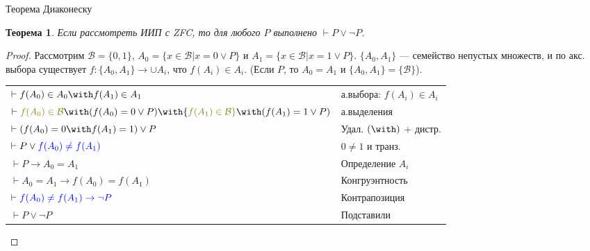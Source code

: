 \documentclass[aspectratio=169]{beamer}
\newtheorem{thm}{Теорема}[section]
\begin{document}
\begin{frame}{Теорема Диаконеску}
\begin{thm}Если рассмотреть ИИП с ZFC, то для любого $P$ выполнено $\vdash P \vee \neg P$.\end{thm}
\begin{proof}Рассмотрим $\mathcal{B} = \{0,1\}$, $A_0 = \{ x \in \mathcal{B} | x = 0 \vee P \}$ и 
$A_1 = \{ x \in \mathcal{B} | x = 1 \vee P\}$.
$\{A_0,A_1\}$ --- семейство непустых множеств, и по акс. выбора существует
$f: \{A_0,A_1\} \rightarrow \cup A_i$, что $f(A_i) \in A_i$. (Если $P$, то $A_0 = A_1$ и $\{A_0,A_1\} = \{\mathcal{B}\}$).

\vspace{0.3cm}
\begin{tabular}{ll}
$\vdash f(A_0) \in A_0 \with f(A_1) \in A_1$ & а.выбора: $f(A_i) \in A_i$\\
$\vdash {\color{olive}f(A_0) \in \mathcal{B}} \with (f(A_0) = 0 \vee P) \with {\color{olive}f(A_1) \in \mathcal{B}} \with (f(A_1) = 1 \vee P)$ & а.выделения\\
$\vdash (f(A_0) = 0 \with f(A_1) = 1) \vee P$ & Удал. $(\with)$ + дистр.\\
$\vdash P\vee{\color{blue}f(A_0) \ne f(A_1)}$ & $0 \ne 1$ и транз.\\\pause
$\vdash P \rightarrow A_0 = A_1$ & Определение $A_i$\\
$\vdash A_0 = A_1 \rightarrow f(A_0) = f(A_1)$ & Конгруэнтность\\
$\vdash \color{blue} f(A_0) \ne f(A_1) \rightarrow \neg P$ & Контрапозиция\\
$\vdash P \vee \neg P$ & Подставили
\end{tabular}
\end{proof}
\end{frame}
\end{document}
